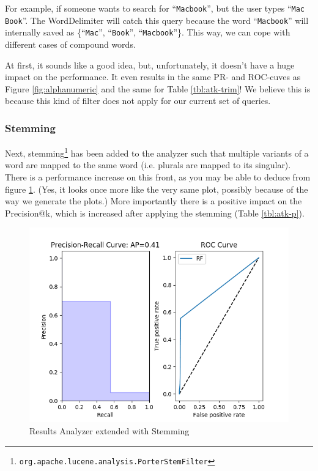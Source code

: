 \documentclass[11pt]{article}
\begin{document}
For example, if someone wants to search for ``\texttt{Macbook}'', but the user types ``\texttt{Mac Book}''. The WordDelimiter will catch this query because the word ``\texttt{Macbook}'' will internally saved as \{``\texttt{Mac}'', ``\texttt{Book}'', ``\texttt{Macbook}''\}. This way, we can cope with different cases of compound words.

At first, it sounds like a good idea, but, unfortunately, it doesn't have a huge impact on the performance. It even results in the same PR- and ROC-cuves as Figure \ref{fig:alphanumeric} and the same for Table \ref{tbl:atk-trim}! We believe this is because this kind of filter does not apply for our current set of queries.

\subsubsection{Stemming}\label{sec:stemming}
Next, stemming\footnote{\texttt{org.apache.lucene.analysis.PorterStemFilter}} has been added to the analyzer such that multiple variants of a word are mapped to the same word (i.e. plurals are mapped to its singular). There is a performance increase on this front, as you may be able to deduce from figure \ref{fig:stemming}. (Yes, it looks once more like the very same plot, possibly because of the way we generate the plots.) More importantly there is a positive impact on the \textsf{Precision@k}, which is increased after applying the stemming (Table \ref{tbl:atk-p}).

\begin{figure}[htp]
    \centering
    \includegraphics[width=\textwidth]{images/2ndTerm/Porter+Trim+WordDelimiter}
    \caption{Results Analyzer extended with Stemming}
    \label{fig:stemming}
\end{figure}
\end{document}
